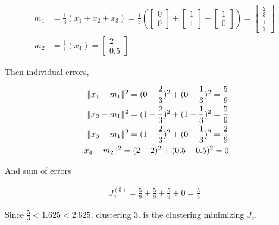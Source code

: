\documentclass[a4paper, 10pt, twoside]{article}
\begin{document}
\begin{enumerate}
	      \begin{align*}
		      m_1 & =
		      \frac{1}{3} (x_1 + x_2 + x_3) =
		      \frac{1}{3} \left(
		      \begin{bmatrix} 0 \\ 0 \end{bmatrix} +
		      \begin{bmatrix} 1 \\ 1 \end{bmatrix} +
		      \begin{bmatrix} 1 \\ 0 \end{bmatrix}
		      \right)                  =
		      \begin{bmatrix} \frac{2}{3} \\ \frac{1}{3} \end{bmatrix} \\
		      m_2 & =
		      \frac{1}{1} (x_4) =
		      \begin{bmatrix} 2 \\ 0.5 \end{bmatrix}
	      \end{align*}

	      Then individual errors,

	      \begin{align*}
		      \Vert x_1 - m_1 \Vert^2 = (0-\frac{2}{3})^2 + (0-\frac{1}{3})^2 = \frac{5}{9} \\
		      \Vert x_2 - m_1 \Vert^2 = (1-\frac{2}{3})^2 + (1-\frac{1}{3})^2 = \frac{5}{9} \\
		      \Vert x_3 - m_1 \Vert^2 = (1-\frac{2}{3})^2 + (0-\frac{1}{3})^2 = \frac{2}{9} \\
		      \Vert x_4 - m_2 \Vert^2 = (2-2)^2 + (0.5-0.5)^2 = 0                           \\
	      \end{align*}

	      And sum of errors

	      \begin{align*}
		      J_e^{(3)} = \frac{5}{9} + \frac{5}{9} + \frac{5}{9} + 0 = \frac{5}{3}
	      \end{align*}
\end{enumerate}
Since $\frac{5}{3} < 1.625 < 2.625$, clustering 3. is the clustering minimizing $J_e$.
\end{document}

